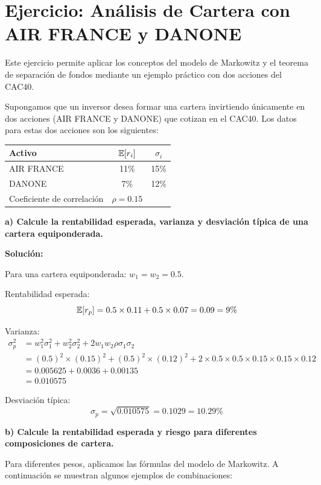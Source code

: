 \section{Ejercicio: Análisis de Cartera con AIR FRANCE y DANONE}

Este ejercicio permite aplicar los conceptos del modelo de Markowitz y el teorema de separación de fondos mediante un ejemplo práctico con dos acciones del CAC40.

\begin{ejemplo}
Supongamos que un inversor desea formar una cartera invirtiendo únicamente en dos acciones (AIR FRANCE y DANONE) que cotizan en el CAC40. Los datos para estas dos acciones son los siguientes:

\begin{center}
\begin{tabular}{lcc}
\toprule
Activo & $\mathbb{E}[r_i]$ & $\sigma_i$ \\
\midrule
AIR FRANCE & 11\% & 15\% \\
DANONE & 7\% & 12\% \\
Coeficiente de correlación & $\rho = 0.15$ & \\
\bottomrule
\end{tabular}
\end{center}

\textbf{a) Calcule la rentabilidad esperada, varianza y desviación típica de una cartera equiponderada.}

\textbf{Solución:}

Para una cartera equiponderada: $w_1 = w_2 = 0.5$.

Rentabilidad esperada:
$$\mathbb{E}[r_p] = 0.5 \times 0.11 + 0.5 \times 0.07 = 0.09 = 9\%$$

Varianza:
\begin{align}
\sigma_p^2 &= w_1^2 \sigma_1^2 + w_2^2 \sigma_2^2 + 2w_1 w_2 \rho \sigma_1 \sigma_2 \\
&= (0.5)^2 \times (0.15)^2 + (0.5)^2 \times (0.12)^2 + 2 \times 0.5 \times 0.5 \times 0.15 \times 0.15 \times 0.12 \\
&= 0.005625 + 0.0036 + 0.00135 \\
&= 0.010575
\end{align}

Desviación típica:
$$\sigma_p = \sqrt{0.010575} = 0.1029 = 10.29\%$$

\textbf{b) Calcule la rentabilidad esperada y riesgo para diferentes composiciones de cartera.}

Para diferentes pesos, aplicamos las fórmulas del modelo de Markowitz. A continuación se muestran algunos ejemplos de combinaciones:


\end{ejemplo}
